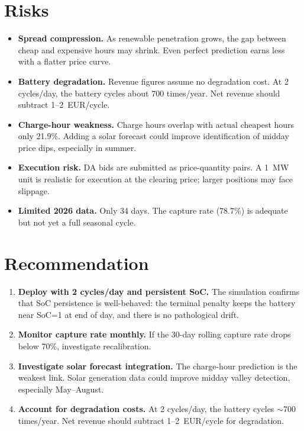 \documentclass[11pt,a4paper]{article}
\begin{document}
\section{Risks}

\begin{itemize}[leftmargin=*]
\item \textbf{Spread compression.} As renewable penetration grows, the gap between cheap and expensive hours may shrink. Even perfect prediction earns less with a flatter price curve.
\item \textbf{Battery degradation.} Revenue figures assume no degradation cost. At 2 cycles/day, the battery cycles about 700 times/year. Net revenue should subtract 1--2~EUR/cycle.
\item \textbf{Charge-hour weakness.} Charge hours overlap with actual cheapest hours only 21.9\%. Adding a solar forecast could improve identification of midday price dips, especially in summer.
\item \textbf{Execution risk.} DA bids are submitted as price-quantity pairs. A 1~MW unit is realistic for execution at the clearing price; larger positions may face slippage.
\item \textbf{Limited 2026 data.} Only 34 days. The capture rate (78.7\%) is adequate but not yet a full seasonal cycle.
\end{itemize}

\section{Recommendation}

\begin{enumerate}[leftmargin=*]
\item \textbf{Deploy with 2 cycles/day and persistent SoC.} The simulation confirms that SoC persistence is well-behaved: the terminal penalty keeps the battery near SoC=1 at end of day, and there is no pathological drift.
\item \textbf{Monitor capture rate monthly.} If the 30-day rolling capture rate drops below 70\%, investigate recalibration.
\item \textbf{Investigate solar forecast integration.} The charge-hour prediction is the weakest link. Solar generation data could improve midday valley detection, especially May--August.
\item \textbf{Account for degradation costs.} At 2 cycles/day, the battery cycles $\sim$700 times/year. Net revenue should subtract 1--2~EUR/cycle for degradation.
\end{enumerate}
\end{document}
